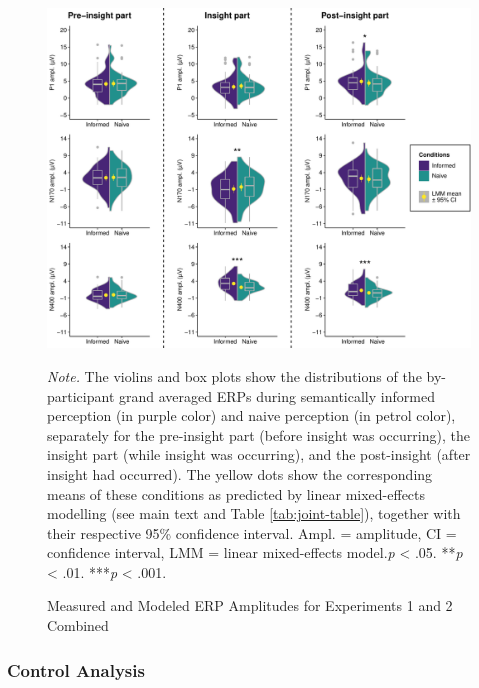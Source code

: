 \documentclass[
  english,
  doc,12pt,twoside,floatsintext]{apa7}
\begin{document}
\begin{figure}

\caption{Measured and Modeled ERP Amplitudes for Experiments 1 and 2 Combined\smallskip}\label{fig:joint-plot}

{\centering \includegraphics[width=1\linewidth]{master_thesis_files/figure-latex/joint-plot-1} 

}

\bigskip\small\emph{Note.} 
The violins and box plots show the distributions of the by-participant grand averaged ERPs during semantically informed perception (in purple color) and naive perception (in petrol color), separately for the pre-insight part (before insight was occurring), the insight part (while insight was occurring), and the post-insight (after insight had occurred). The yellow dots show the corresponding means of these conditions as predicted by linear mixed-effects modelling (see main text and Table \ref{tab:joint-table}), together with their respective 95\% confidence interval. Ampl. = amplitude, CI = confidence interval, LMM = linear mixed-effects model.\newline*\emph{p} \textless{} .05. **\emph{p} \textless{} .01. ***\emph{p} \textless{} .001.

\end{figure}

\hypertarget{control-analysis}{%
\subsubsection{Control Analysis}\label{control-analysis}}
\end{document}
